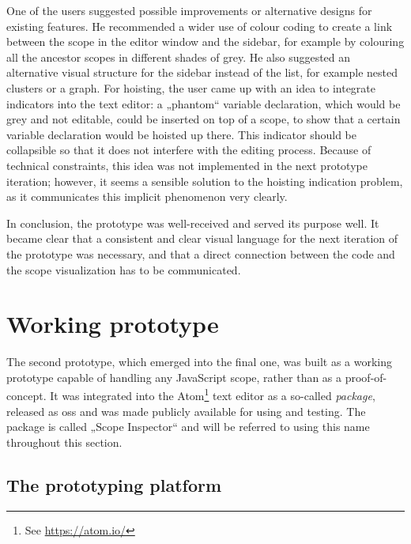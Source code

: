 One of the users suggested possible improvements or alternative designs
for existing features. He recommended a wider use of colour coding to
create a link between the scope in the editor window and the sidebar,
for example by colouring all the ancestor scopes in different shades of
grey. He also suggested an alternative visual structure for the sidebar
instead of the list, for example nested clusters or a graph. For
hoisting, the user came up with an idea to integrate indicators into the
text editor: a „phantom“ variable declaration, which would be grey and
not editable, could be inserted on top of a scope, to show that a
certain variable declaration would be hoisted up there. This indicator
should be collapsible so that it does not interfere with the editing
process. Because of technical constraints, this idea was not implemented
in the next prototype iteration; however, it seems a sensible solution
to the hoisting indication problem, as it communicates this implicit
phenomenon very clearly.

In conclusion, the prototype was well-received and served its purpose
well. It became clear that a consistent and clear visual language for
the next iteration of the prototype was necessary, and that a direct
connection between the code and the scope visualization has to be
communicated.

\section{Working prototype}\label{working-prototype}

The second prototype, which emerged into the final one, was built as a
working prototype capable of handling any JavaScript scope, rather than
as a proof-of-concept. It was integrated into the
Atom\footnote{See \url{https://atom.io/}} text editor as a so-called
\emph{package}, released as \gls{oss} and was made publicly available
for using and testing. The package is called „Scope Inspector“ and will
be referred to using this name throughout this section.

\subsection{The prototyping platform}\label{the-prototyping-platform}

